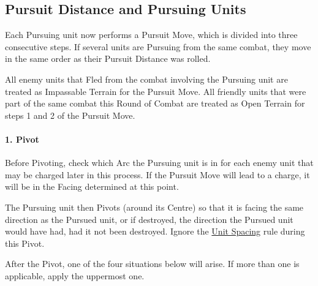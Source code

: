 \subsection{Pursuit Distance and Pursuing Units}
\label{pursuit_distance_and_pursuing_units}

Each Pursuing unit now performs a Pursuit Move, which is divided into three consecutive steps. If several units are Pursuing from the same combat, they move in the same order as their Pursuit Distance was rolled.

All enemy units that Fled from the combat involving the Pursuing unit are treated as Impassable Terrain for the Pursuit Move. All friendly units that were part of the same combat this Round of Combat are treated as Open Terrain for steps 1 and 2 of the Pursuit Move.

\paragraph{1. Pivot}

Before Pivoting, check which Arc the Pursuing unit is in for each enemy unit that may be charged later in this process. If the Pursuit Move will lead to a charge, it will be in the Facing determined at this point.

The Pursuing unit then Pivots (around its Centre) so that it is facing the same direction as the Pursued unit, or if destroyed, the direction the Pursued unit would have had, had it not been destroyed. Ignore the \hyperref[unit_spacing]{Unit Spacing} rule during this Pivot.

After the Pivot, one of the four situations below will arise. If more than one is applicable, apply the uppermost one.

